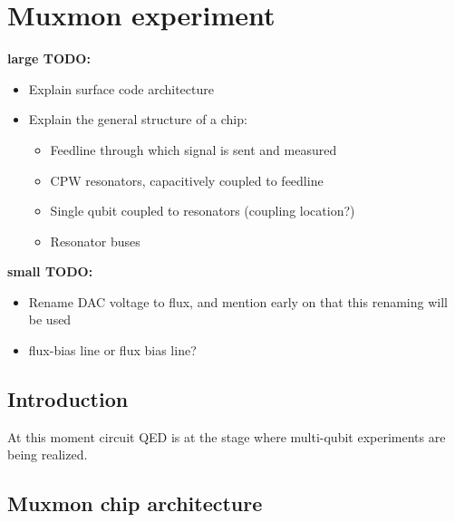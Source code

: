 \part{Muxmon experiment}

  \textbf{large TODO:}
  \begin{itemize}
    \item Explain surface code architecture
    \item Explain the general structure of a chip:
    \begin{itemize}
      \item Feedline through which signal is sent and measured
      \item CPW resonators, capacitively coupled to feedline
      \item Single qubit coupled to resonators (coupling location?)
      \item Resonator buses
    \end{itemize}
  \end{itemize}

  \textbf{small TODO:}
  \begin{itemize}
    \item Rename DAC voltage to flux, and mention early on that this renaming will be used
    \item flux-bias line or flux bias line?
  \end{itemize}



  \chapter*{Introduction}

    At this moment circuit QED is at the stage where multi-qubit experiments are being realized.



  \chapter{Muxmon chip architecture}

